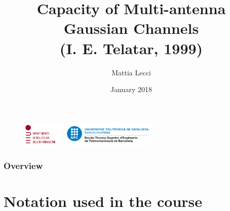 \documentclass{beamer}
\title[Notation]{Capacity of Multi-antenna Gaussian Channels\\
	(I. E. Telatar, 1999)} %
\author[Lecci]{Mattia Lecci\inst{1}\inst{2}} %
\institute[UniPD/UPC] %
{
	\inst{1}
	Universit\`a degli Studi di Padova\\
	Department of Information Engineering\\
	(DEI-UniPD)
	\and
	\inst{2}
	Universitat Polit\`{e}cnica de Catalunya\\ %
	Escola T\`ecnica Superior d'Engenyeria de Telecomunicaci\'o  de Barcelona\\
	(UPC-ETSETB)
}
\date{January 2018} %
\begin{document}
\begin{frame}
\titlepage %
\begin{figure}
	\hspace{2cm}
	\includegraphics[height = 1.2cm]{img/dei_logo}
	\hfill
	\includegraphics[height = 1.2cm]{img/ETSETB-positiu-p3005}
	\hspace{1cm}
\end{figure}
\end{frame}

\begin{frame}
\frametitle{Overview} %
	\tableofcontents
\end{frame}


\section{Notation used in the course} %

\end{document}
